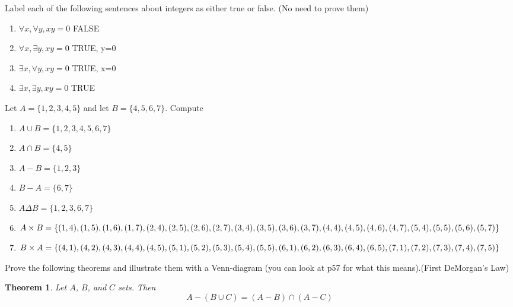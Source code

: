 \documentclass[11pt]{preprint}
\def\enumb{\begin{enumerate}}
\def\enume{\end{enumerate}}
\newtheorem{theorem}{Theorem}
\begin{document}
\item Label each of the following sentences about integers as either true or false. (No need to prove them)
\enumb
\item $\forall x,\forall y, xy=0$ FALSE
\item $\forall x, \exists y, xy=0$ TRUE, y=0
\item $\exists x,\forall y, xy=0$ TRUE, x=0
\item $\exists x,\exists y, xy=0$ TRUE
\enume

%
%
%
%

\item Let $A=\{1,2,3,4,5\}$ and let $B=\{4,5,6,7\}$. Compute
\enumb
\item $A\cup B=\{1,2,3,4,5,6,7\}$
\item $A\cap B=\{4,5\}$
\item $A-B=\{1,2,3\}$
\item $B-A=\{6,7\}$
\item $A\Delta B=\{1,2,3,6,7\}$
\item $A\times B=\{(1,4),(1,5),(1,6),(1,7),(2,4),(2,5),(2,6),(2,7),(3,4),\\
(3,5),(3,6),(3,7),(4,4),(4,5),(4,6),(4,7),(5,4),(5,5),(5,6),(5,7)\}$
\item $B\times A=\{(4,1),(4,2),(4,3),(4,4),(4,5),(5,1),(5,2),(5,3),\\(5,4),(5,5),(6,1),(6,2),(6,3),(6,4),(6,5),(7,1),(7,2),(7,3),(7,4),(7,5)\}$
\enume

\item Prove the following theorems and illustrate them with a Venn-diagram (you can look at p57 for what this means).(First DeMorgan's Law)
\begin{theorem}
Let $A$, $B$, and $C$ sets. Then
\[
A-(B\cup C)=(A-B)\cap(A-C)
\]
\end{theorem}
\end{document}
